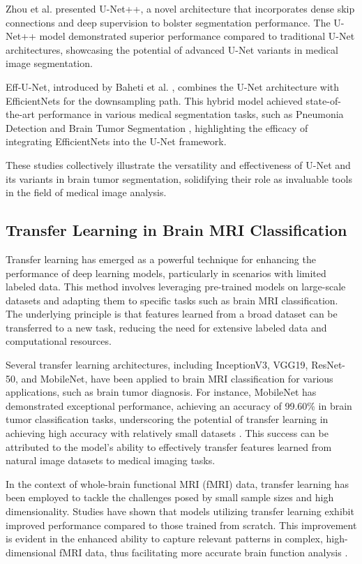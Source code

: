 Zhou et al. \cite{zhou2018unetplusplus} presented U-Net++, a novel architecture that incorporates dense skip connections and deep supervision to bolster segmentation performance. The U-Net++ model demonstrated superior performance compared to traditional U-Net architectures, showcasing the potential of advanced U-Net variants in medical image segmentation.

Eff-U-Net, introduced by Baheti et al. \cite{baheti_eff-unet_2020}, combines the U-Net architecture with EfficientNets for the downsampling path. This hybrid model achieved state-of-the-art performance in various medical segmentation tasks, such as Pneumonia Detection \cite{yu_pneumonia_2021} and Brain Tumor Segmentation \cite{lin_brain_2024}, highlighting the efficacy of integrating EfficientNets into the U-Net framework.

These studies collectively illustrate the versatility and effectiveness of U-Net and its variants in brain tumor segmentation, solidifying their role as invaluable tools in the field of medical image analysis.

\subsection{Transfer Learning in Brain MRI Classification}

Transfer learning has emerged as a powerful technique for enhancing the performance of deep learning models, particularly in scenarios with limited labeled data. This method involves leveraging pre-trained models on large-scale datasets and adapting them to specific tasks such as brain MRI classification. The underlying principle is that features learned from a broad dataset can be transferred to a new task, reducing the need for extensive labeled data and computational resources.

Several transfer learning architectures, including InceptionV3, VGG19, ResNet-50, and MobileNet, have been applied to brain MRI classification for various applications, such as brain tumor diagnosis. For instance, MobileNet has demonstrated exceptional performance, achieving an accuracy of 99.60\% in brain tumor classification tasks, underscoring the potential of transfer learning in achieving high accuracy with relatively small datasets  \cite{Islam_Barua_Rahman_Ahammed_Akter_Uddin_2023}. This success can be attributed to the model's ability to effectively transfer features learned from natural image datasets to medical imaging tasks.

In the context of whole-brain functional MRI (fMRI) data, transfer learning has been employed to tackle the challenges posed by small sample sizes and high dimensionality. Studies have shown that models utilizing transfer learning exhibit improved performance compared to those trained from scratch. This improvement is evident in the enhanced ability to capture relevant patterns in complex, high-dimensional fMRI data, thus facilitating more accurate brain function analysis \cite{10.1007/978-3-030-32695-1_7}.

